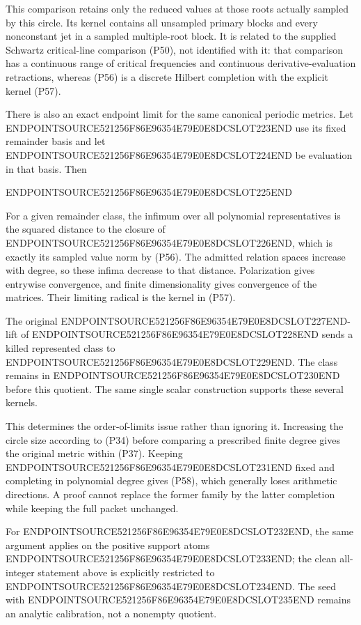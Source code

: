 This comparison retains only the reduced values at those roots actually sampled by this circle. Its kernel contains all unsampled primary blocks and every nonconstant jet in a sampled multiple-root block. It is related to the supplied Schwartz critical-line comparison (P50), not identified with it: that comparison has a continuous range of critical frequencies and continuous derivative-evaluation retractions, whereas (P56) is a discrete Hilbert completion with the explicit kernel (P57).

There is also an exact endpoint limit for the same canonical periodic metrics. Let ENDPOINTSOURCE521256F86E96354E79E0E8DCSLOT223END use its fixed remainder basis and let ENDPOINTSOURCE521256F86E96354E79E0E8DCSLOT224END be evaluation in that basis. Then

ENDPOINTSOURCE521256F86E96354E79E0E8DCSLOT225END

For a given remainder class, the infimum over all polynomial representatives is the squared distance to the closure of ENDPOINTSOURCE521256F86E96354E79E0E8DCSLOT226END, which is exactly its sampled value norm by (P56). The admitted relation spaces increase with degree, so these infima decrease to that distance. Polarization gives entrywise convergence, and finite dimensionality gives convergence of the matrices. Their limiting radical is the kernel in (P57).

The original ENDPOINTSOURCE521256F86E96354E79E0E8DCSLOT227END-lift of ENDPOINTSOURCE521256F86E96354E79E0E8DCSLOT228END sends a killed represented class to ENDPOINTSOURCE521256F86E96354E79E0E8DCSLOT229END. The class remains in ENDPOINTSOURCE521256F86E96354E79E0E8DCSLOT230END before this quotient. The same single scalar construction supports these several kernels.

This determines the order-of-limits issue rather than ignoring it. Increasing the circle size according to (P34) before comparing a prescribed finite degree gives the original metric within (P37). Keeping ENDPOINTSOURCE521256F86E96354E79E0E8DCSLOT231END fixed and completing in polynomial degree gives (P58), which generally loses arithmetic directions. A proof cannot replace the former family by the latter completion while keeping the full packet unchanged.

For ENDPOINTSOURCE521256F86E96354E79E0E8DCSLOT232END, the same argument applies on the positive support atoms ENDPOINTSOURCE521256F86E96354E79E0E8DCSLOT233END; the clean all-integer statement above is explicitly restricted to ENDPOINTSOURCE521256F86E96354E79E0E8DCSLOT234END. The seed with ENDPOINTSOURCE521256F86E96354E79E0E8DCSLOT235END remains an analytic calibration, not a nonempty quotient.

